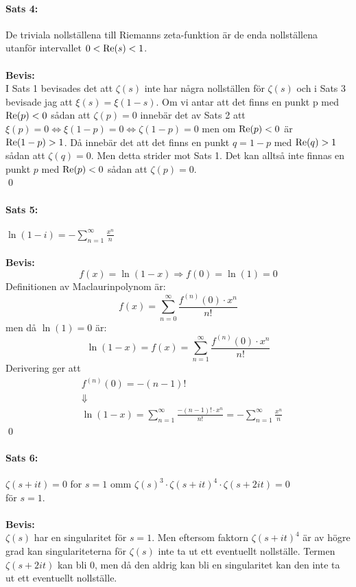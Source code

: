 \documentclass[a4paper,twoside]{article}%
\begin{document}
\paragraph{Sats 4:} De triviala nollställena till Riemanns zeta-funktion är de enda nollställena utanför intervallet $0 < \operatorname{Re}(s) < 1$.\\
\\
{\bf Bevis:}\\ %
I Sats 1 bevisades det att $\zeta(s)$ inte har några nollställen för $\zeta(s)$ och i Sats 3 bevisade jag att $\xi(s) = \xi(1 - s)$.
Om vi antar att det finns en punkt p med $\operatorname{Re}(p) < 0$ sådan att $\zeta(p) = 0$ innebär det av Sats 2 att $\xi(p) = 0 \Leftrightarrow
\xi(1 - p) = 0 \Leftrightarrow \zeta(1 - p) = 0$ men om $\operatorname{Re}(p) < 0$ är $\operatorname{Re}(1 - p) > 1$. Då innebär det att det finns en punkt
$q = 1 - p$ med $\operatorname{Re}(q) > 1$ sådan att $\zeta(q) = 0$. Men detta strider mot Sats 1. Det kan alltså inte finnas en punkt $p$ med
$\operatorname{Re}(p) < 0$ sådan att $\zeta(p) = 0$. \\
\hfill \qed %

\pagebreak

\paragraph{Sats 5:} $\ln(1 - i) = - \sum\limits_{n = 1}^\infty \frac {x^n} n$ \\
\\
{\bf Bevis:}\\
\[
	f(x) = \ln(1 - x) \Rightarrow f(0) = \ln(1) = 0
\]
Definitionen av Maclaurinpolynom är:
\newcommand{\mymac}[1] {
	f(x) = \sum_{n = #1}^\infty \frac {
		f^{(n)}(0) \cdot x^n
	} {
		n!
	}
}
\[
	\mymac{0}
\]
men då $\ln(1) = 0$ är:
\[
	\ln(1 - x) = \mymac{1}
\]
Derivering ger att
\begin{align*}
	&f^{(n)}(0) = -(n - 1)! \\
	&\Downarrow \\ 
	&\ln(1 - x) = \sum_{n = 1}^\infty \frac {-(n - 1)! \cdot x^n} {n!} =
			- \sum_{n = 1}^\infty \frac {x^n} n
\end{align*}
\hfill \qed

\paragraph{Sats 6:} $\zeta(s + it) = 0$ for $s = 1$ omm $\zeta(s)^3 \cdot \zeta(s + it)^4 \cdot \zeta(s + 2it) = 0$ \\
för $s = 1$. \\
\\
{\bf Bevis:}\\
$\zeta(s)$ har en singularitet för $s = 1$. Men eftersom faktorn $\zeta(s + it)^4$ är av högre grad kan singulariteterna
för $\zeta(s)$ inte ta ut ett eventuellt nollställe. Termen $\zeta(s + 2it)$ kan bli $0$, men då den aldrig kan bli en 
singularitet kan den inte ta ut ett eventuellt nollställe.\\
\end{document}
